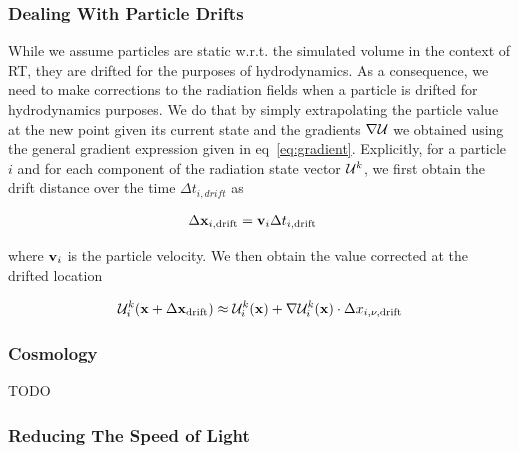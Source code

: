 \subsubsection{Dealing With Particle Drifts}\label{chap:rt-drift}

While we assume particles are static w.r.t. the simulated volume in the context of RT, they are
drifted for the purposes of hydrodynamics. As a consequence, we need to make corrections to the
radiation fields when a particle is drifted for hydrodynamics purposes. We do that by simply
extrapolating the particle value at the new point given its current state and the gradients $\nabla
\mathcal{U}$ we obtained using the general gradient expression given in eq~\ref{eq:gradient}. Explicitly, for
a particle $i$ and for each component of the radiation state vector $\mathcal{U}^k$, we first obtain the
drift distance over the time $\Delta t_{i, drift}$ as

\begin{align}
\Delta \mathbf{x}_{i,\text{drift}} &= \mathbf{v}_{i} \Delta t_{i,\text{drift}}
\end{align}

where $\mathbf{v}_i$ is the particle velocity. We then obtain the value corrected at the drifted
location

\begin{align}
\mathcal{U}_{i}^k (\mathbf{x} + \Delta \mathbf{x}_{\text{drift}}) \approx \mathcal{U}_{i}^k (\mathbf{x}) + \nabla \mathcal{U}_{i}^k (\mathbf{x}) \cdot \Delta
x_{i,\nu,\text{drift}}
\end{align}









\subsubsection{Cosmology}

TODO








\subsubsection{Reducing The Speed of Light}


